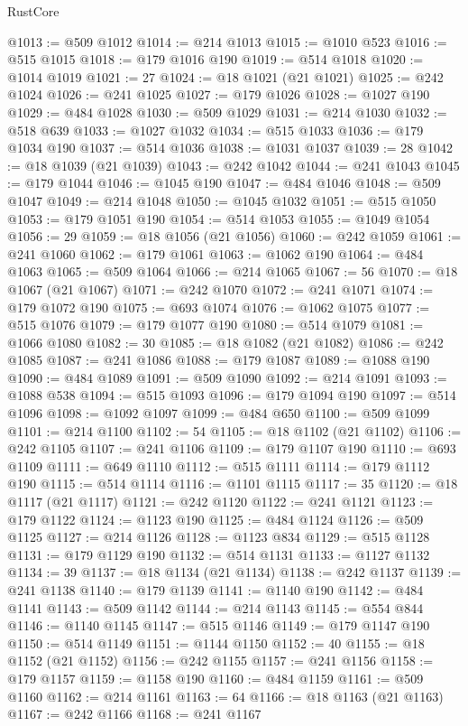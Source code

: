 \begin{lexlean}{RustCore}
\begin{coremodule}
@1013 := @509 @1012
@1014 := @214 @1013
@1015 := @1010 @523
@1016 := @515 @1015
@1018 := @179 @1016 @190
@1019 := @514 @1018
@1020 := @1014 @1019
@1021 := 27
@1024 := @18 @1021 (@21 @1021)
@1025 := @242 @1024
@1026 := @241 @1025
@1027 := @179 @1026
@1028 := @1027 @190
@1029 := @484 @1028
@1030 := @509 @1029
@1031 := @214 @1030
@1032 := @518 @639
@1033 := @1027 @1032
@1034 := @515 @1033
@1036 := @179 @1034 @190
@1037 := @514 @1036
@1038 := @1031 @1037
@1039 := 28
@1042 := @18 @1039 (@21 @1039)
@1043 := @242 @1042
@1044 := @241 @1043
@1045 := @179 @1044
@1046 := @1045 @190
@1047 := @484 @1046
@1048 := @509 @1047
@1049 := @214 @1048
@1050 := @1045 @1032
@1051 := @515 @1050
@1053 := @179 @1051 @190
@1054 := @514 @1053
@1055 := @1049 @1054
@1056 := 29
@1059 := @18 @1056 (@21 @1056)
@1060 := @242 @1059
@1061 := @241 @1060
@1062 := @179 @1061
@1063 := @1062 @190
@1064 := @484 @1063
@1065 := @509 @1064
@1066 := @214 @1065
@1067 := 56
@1070 := @18 @1067 (@21 @1067)
@1071 := @242 @1070
@1072 := @241 @1071
@1074 := @179 @1072 @190
@1075 := @693 @1074
@1076 := @1062 @1075
@1077 := @515 @1076
@1079 := @179 @1077 @190
@1080 := @514 @1079
@1081 := @1066 @1080
@1082 := 30
@1085 := @18 @1082 (@21 @1082)
@1086 := @242 @1085
@1087 := @241 @1086
@1088 := @179 @1087
@1089 := @1088 @190
@1090 := @484 @1089
@1091 := @509 @1090
@1092 := @214 @1091
@1093 := @1088 @538
@1094 := @515 @1093
@1096 := @179 @1094 @190
@1097 := @514 @1096
@1098 := @1092 @1097
@1099 := @484 @650
@1100 := @509 @1099
@1101 := @214 @1100
@1102 := 54
@1105 := @18 @1102 (@21 @1102)
@1106 := @242 @1105
@1107 := @241 @1106
@1109 := @179 @1107 @190
@1110 := @693 @1109
@1111 := @649 @1110
@1112 := @515 @1111
@1114 := @179 @1112 @190
@1115 := @514 @1114
@1116 := @1101 @1115
@1117 := 35
@1120 := @18 @1117 (@21 @1117)
@1121 := @242 @1120
@1122 := @241 @1121
@1123 := @179 @1122
@1124 := @1123 @190
@1125 := @484 @1124
@1126 := @509 @1125
@1127 := @214 @1126
@1128 := @1123 @834
@1129 := @515 @1128
@1131 := @179 @1129 @190
@1132 := @514 @1131
@1133 := @1127 @1132
@1134 := 39
@1137 := @18 @1134 (@21 @1134)
@1138 := @242 @1137
@1139 := @241 @1138
@1140 := @179 @1139
@1141 := @1140 @190
@1142 := @484 @1141
@1143 := @509 @1142
@1144 := @214 @1143
@1145 := @554 @844
@1146 := @1140 @1145
@1147 := @515 @1146
@1149 := @179 @1147 @190
@1150 := @514 @1149
@1151 := @1144 @1150
@1152 := 40
@1155 := @18 @1152 (@21 @1152)
@1156 := @242 @1155
@1157 := @241 @1156
@1158 := @179 @1157
@1159 := @1158 @190
@1160 := @484 @1159
@1161 := @509 @1160
@1162 := @214 @1161
@1163 := 64
@1166 := @18 @1163 (@21 @1163)
@1167 := @242 @1166
@1168 := @241 @1167

\end{coremodule}
\end{lexlean}
